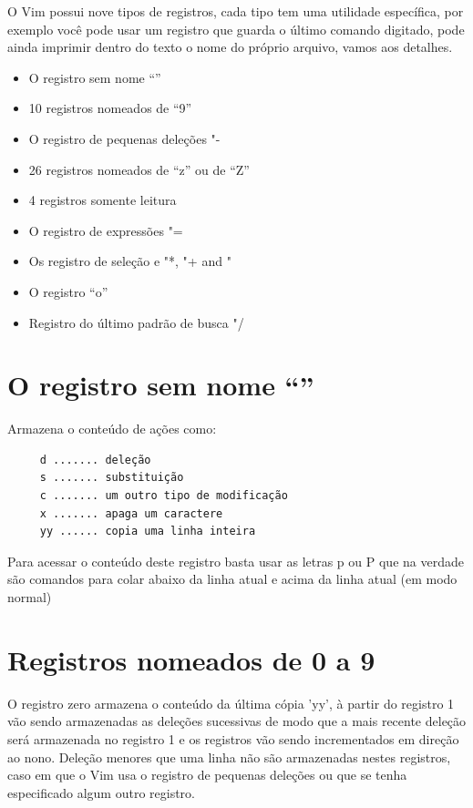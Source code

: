 \documentclass[10pt,a4paper,openany]{book}
\begin{document}
O Vim possui nove tipos de registros, cada tipo tem uma utilidade
específica, por exemplo você pode usar um registro que guarda o último
comando digitado, pode ainda imprimir dentro do texto o nome do
próprio arquivo, vamos aos detalhes.

\begin{itemize}
   \item O registro sem nome ``''
   \item 10 registros nomeados de ``9''
   \item O registro de pequenas deleções "-
   \item 26 registros nomeados de ``z'' ou de ``Z''
   \item 4 registros somente leitura
   \item O registro de expressões "=
   \item Os registro de seleção e  "*, "+ and "~
   \item O registro ``o''
   \item Registro do último padrão de busca "/
\end{itemize}

\section{O registro sem nome ``''}
\label{O registro sem nome ``''}

Armazena o conteúdo de ações como:

\begin{verbatim}
     d ....... deleção
     s ....... substituição
     c ....... um outro tipo de modificação
     x ....... apaga um caractere
     yy ...... copia uma linha inteira
\end{verbatim}

Para acessar o conteúdo deste registro basta usar as letras p ou P que
na verdade são comandos para colar abaixo da linha atual e acima da
linha atual (em modo normal)

\section{Registros nomeados de 0 a 9}
\label{Registros nomeados de 0 a 9}

O registro zero armazena o conteúdo da última cópia 'yy', à partir do
registro 1 vão sendo armazenadas as deleções sucessivas de modo que a
mais recente deleção será armazenada no registro 1 e os registros vão
sendo incrementados em direção ao nono.  Deleção menores que uma linha
não são armazenadas nestes registros, caso em que o Vim usa o registro
de pequenas deleções ou que se tenha especificado algum outro
registro.
\end{document}
